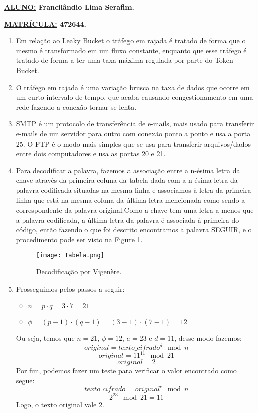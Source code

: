 \documentclass[a4paper, 12pt]{article}
\begin{document}
\textbf{\underline{ALUNO:} Francilândio Lima Serafim.}

\textbf{\underline{MATRÍCULA:} 472644.}
\begin{enumerate}
	\item Em relação ao Leaky Bucket o tráfego em rajada é tratado de forma que o mesmo é transformado em um fluxo constante, enquanto que esse tráfego é tratado de forma a ter uma taxa máxima regulada por parte do Token Bucket.
	\item O tráfego em rajada é uma variação brusca na taxa de dados que ocorre em um curto intervalo de tempo, que acaba causando congestionamento em uma rede fazendo a conexão tornar-se lenta.
	\item SMTP é um protocolo de transferência de e-mails, mais usado para transferir e-mails de um servidor para outro com conexão ponto a ponto e usa a porta 25. O FTP é o modo mais simples que se usa para transferir arquivos/dados entre dois computadores e usa as portas 20 e 21.
	\item Para decodificar a palavra, fazemos a associação entre a n-ésima letra da chave através da primeira coluna da tabela dada com a n-ésima letra da palavra codificada situadas na mesma linha e associamos à letra da primeira linha que está na mesma coluna da última letra mencionada como sendo a correspondente da palavra original.Como a chave tem uma letra a menos que a palavra codificada, a última letra da palavra é associada à primeira do código, então fazendo o que foi descrito encontramos a palavra SEGUIR, e o procedimento pode ser visto na Figure \ref{fig1}.
	\begin{figure}[!htb]
		\caption{Decodificação por Vigenère.}
		\centering
		\texttt{[image: Tabela.png]}
		\label{fig1}
	\end{figure}
	\item Prosseguimos pelos passos a seguir:
	\begin{itemize}
		\item $n = p\cdot q = 3\cdot 7 = 21$
		\item $\phi = (p-1)\cdot (q-1) = (3-1)\cdot (7-1) = 12$
	\end{itemize}
	
	Ou seja, temos que $n = 21$, $\phi = 12$, $e = 23$ e $d = 11$, desse modo fazemos:$$original = texto\_cifrado^{d}\mod n$$
	$$original = 11^{11}\mod 21$$
	$$original = 2$$
	Por fim, podemos fazer um teste para verificar o valor encontrado como segue:$$texto\_cifrado = original^e\mod n$$
	$$2^{23}\mod 21 = 11$$
	Logo, o texto original vale 2.
\end{enumerate}
\end{document}
